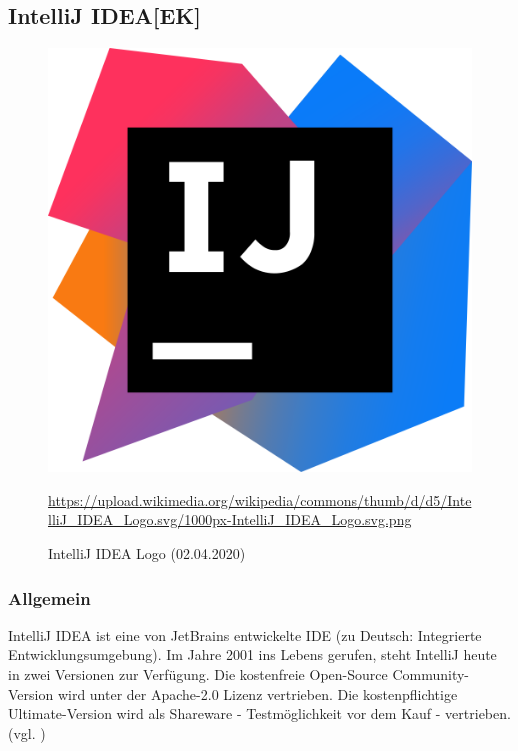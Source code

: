 \subsection{IntelliJ IDEA[EK]}
\begin{figure}[H]
\centering
  \includegraphics[scale=0.1]{images/intellij_idea_logo.png}
  \caption{IntelliJ IDEA Logo (02.04.2020)}
  \url{https://upload.wikimedia.org/wikipedia/commons/thumb/d/d5/IntelliJ_IDEA_Logo.svg/1000px-IntelliJ_IDEA_Logo.svg.png}
\end{figure}
\subsubsection{Allgemein}
IntelliJ IDEA ist eine von JetBrains entwickelte IDE (zu Deutsch: Integrierte Entwicklungsumgebung). Im Jahre 2001 ins Lebens gerufen, steht IntelliJ heute in zwei Versionen zur Verfügung. Die kostenfreie Open-Source Community-Version wird unter der Apache-2.0 Lizenz vertrieben. Die kostenpflichtige Ultimate-Version wird als Shareware - Testmöglichkeit vor dem Kauf - vertrieben.
(vgl. \cite{IntelliJ-Background})
